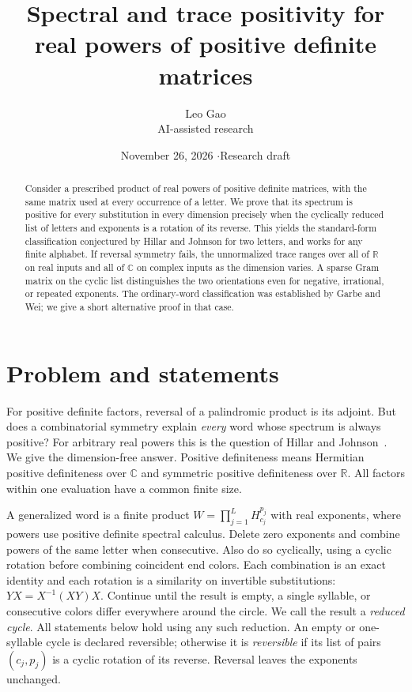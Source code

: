 \documentclass[11pt]{article}
\title{Spectral and trace positivity for real powers of positive definite matrices}
\author{Leo Gao\\[-1pt]{\small AI-assisted research}}
\date{November 26, 2026 \quad$\cdot$\quad Research draft}
\newcommand{\R}{\mathbb R}
\newcommand{\C}{\mathbb C}
\begin{document}
\maketitle
\begin{abstract}
Consider a prescribed product of real powers of positive definite matrices, with the same matrix used at every occurrence of a letter. We prove that its spectrum is positive for every substitution in every dimension precisely when the cyclically reduced list of letters and exponents is a rotation of its reverse. This yields the standard-form classification conjectured by Hillar and Johnson for two letters, and works for any finite alphabet. If reversal symmetry fails, the unnormalized trace ranges over all of $\R$ on real inputs and all of $\C$ on complex inputs as the dimension varies. A sparse Gram matrix on the cyclic list distinguishes the two orientations even for negative, irrational, or repeated exponents. The ordinary-word classification was established by Garbe and Wei; we give a short alternative proof in that case.
\end{abstract}

\section{Problem and statements}

For positive definite factors, reversal of a palindromic product is its adjoint. But does a combinatorial symmetry explain \emph{every} word whose spectrum is always positive? For arbitrary real powers this is the question of Hillar and Johnson~\cite{HJ2}. We give the dimension-free answer. Positive definiteness means Hermitian positive definiteness over $\C$ and symmetric positive definiteness over $\R$. All factors within one evaluation have a common finite size.

A generalized word is a finite product $W=\prod_{j=1}^L H_{c_j}^{p_j}$ with real exponents, where powers use positive definite spectral calculus. Delete zero exponents and combine powers of the same letter when consecutive. Also do so cyclically, using a cyclic rotation before combining coincident end colors. Each combination is an exact identity and each rotation is a similarity on invertible substitutions: $YX=X^{-1}(XY)X$. Continue until the result is empty, a single syllable, or consecutive colors differ everywhere around the circle. We call the result a \emph{reduced cycle}. All statements below hold using any such reduction. An empty or one-syllable cycle is declared reversible; otherwise it is \emph{reversible} if its list of pairs $(c_j,p_j)$ is a cyclic rotation of its reverse. Reversal leaves the exponents unchanged.
\end{document}
